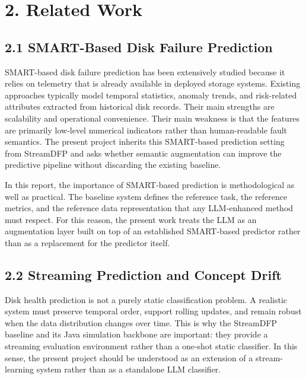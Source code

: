 \documentclass[
  11pt,
  a4paper]{article}
\begin{document}
\hypertarget{related-work}{%
\section{2. Related Work}\label{related-work}}

\hypertarget{smart-based-disk-failure-prediction}{%
\subsection{2.1 SMART-Based Disk Failure
Prediction}\label{smart-based-disk-failure-prediction}}

SMART-based disk failure prediction has been extensively studied because
it relies on telemetry that is already available in deployed storage
systems. Existing approaches typically model temporal statistics,
anomaly trends, and risk-related attributes extracted from historical
disk records. Their main strengths are scalability and operational
convenience. Their main weakness is that the features are primarily
low-level numerical indicators rather than human-readable fault
semantics. The present project inherits this SMART-based prediction
setting from StreamDFP and asks whether semantic augmentation can
improve the predictive pipeline without discarding the existing
baseline.

In this report, the importance of SMART-based prediction is
methodological as well as practical. The baseline system defines the
reference task, the reference metrics, and the reference data
representation that any LLM-enhanced method must respect. For this
reason, the present work treats the LLM as an augmentation layer built
on top of an established SMART-based predictor rather than as a
replacement for the predictor itself.

\hypertarget{streaming-prediction-and-concept-drift}{%
\subsection{2.2 Streaming Prediction and Concept
Drift}\label{streaming-prediction-and-concept-drift}}

Disk health prediction is not a purely static classification problem. A
realistic system must preserve temporal order, support rolling updates,
and remain robust when the data distribution changes over time. This is
why the StreamDFP baseline and its Java simulation backbone are
important: they provide a streaming evaluation environment rather than a
one-shot static classifier. In this sense, the present project should be
understood as an extension of a stream-learning system rather than as a
standalone LLM classifier.
\end{document}
